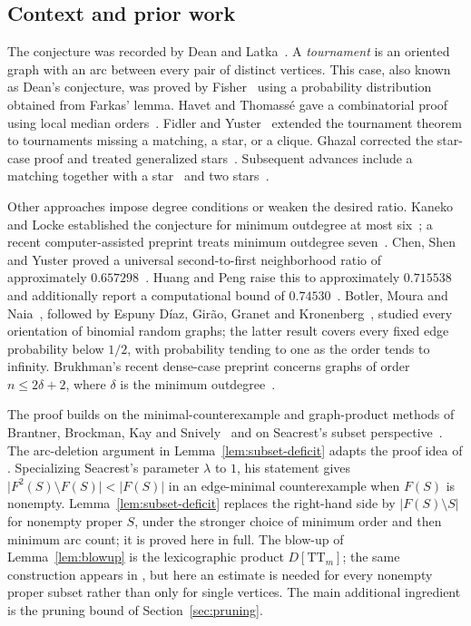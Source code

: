 \documentclass[11pt]{article}
\theoremstyle{remark}
\newcommand{\abs}[1]{\lvert #1\rvert}
\newcommand{\TT}{\mathrm{TT}}
\begin{document}
\subsection{Context and prior work}

The conjecture was recorded by Dean and Latka~\cite{DeanLatka1995}.
A \emph{tournament} is an oriented graph with an arc between every pair of
distinct vertices.  This case, also known as Dean's conjecture, was proved
by Fisher~\cite{Fisher1996} using a probability distribution obtained from
Farkas' lemma.  Havet and Thomass\'e gave a combinatorial proof using
local median orders~\cite{HavetThomasse2000}.  Fidler and
Yuster~\cite{FidlerYuster2007} extended the tournament theorem to
tournaments missing a matching, a star, or a clique.  Ghazal corrected the
star-case proof and treated generalized stars~\cite{Ghazal2012}.
Subsequent advances include a matching together with a
star~\cite{DaraFrancisJacobNarayanan2022} and two
stars~\cite{DaamouchAlMninyGhazal2025}.

Other approaches impose degree conditions or weaken the desired ratio.
Kaneko and Locke established the conjecture for minimum outdegree at most
six~\cite{KanekoLocke2001}; a recent computer-assisted preprint treats
minimum outdegree seven~\cite{SadhukhanSandeepSen2026}.
Chen, Shen and Yuster proved a universal second-to-first neighborhood
ratio of approximately $0.657298$~\cite{ChenShenYuster2003}.
Huang and Peng raise this to approximately $0.715538$ and additionally
report a computational bound of $0.74530$~\cite{HuangPeng2024}.
Botler, Moura and Naia~\cite{BotlerMouraNaia2023}, followed by
Espuny D\'iaz, Gir\~ao, Granet and Kronenberg~\cite{EspunyDiazEtAl2025},
studied every orientation of binomial random graphs; the latter result
covers every fixed edge probability below $1/2$, with probability tending
to one as the order tends to infinity.  Brukhman's recent dense-case
preprint concerns graphs of order $n\leq 2\delta+2$, where $\delta$ is
the minimum outdegree~\cite{Brukhman2026}.

The proof builds on the minimal-counterexample and graph-product
methods of Brantner, Brockman, Kay and
Snively~\cite{BrantnerBrockmanKaySnively2009} and on Seacrest's
subset perspective~\cite{Seacrest2019}.  The arc-deletion argument in
Lemma~\ref{lem:subset-deficit} adapts the proof idea of
\cite[Lemma~4]{Seacrest2019}.  Specializing Seacrest's parameter $\lambda$
to $1$, his statement gives
$\abs{F^2(S)\setminus F(S)}<\abs{F(S)}$ in an edge-minimal
counterexample when $F(S)$ is nonempty.  Lemma~\ref{lem:subset-deficit}
replaces the right-hand side by $\abs{F(S)\setminus S}$ for nonempty proper
$S$, under the stronger choice of minimum order and then minimum arc count;
it is proved here in full.  The blow-up of Lemma~\ref{lem:blowup} is the
lexicographic product $D[\TT_m]$; the same construction appears in
\cite[Theorem~4.3]{BrantnerBrockmanKaySnively2009}, but here an estimate is
needed for every nonempty proper subset rather than only for single vertices.
The main additional ingredient is the pruning bound of
Section~\ref{sec:pruning}.
\end{document}
